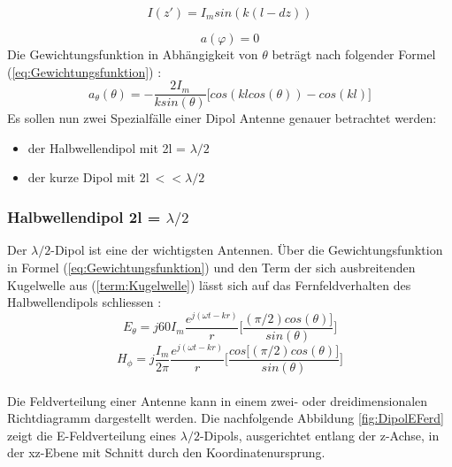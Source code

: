 \begin{equation}
I(z')=I_{m}sin(k(l-dz))
\end{equation}

\begin{equation}
a(\varphi)= 0
\end{equation}
Die Gewichtungsfunktion in Abhängigkeit von $\theta$ beträgt nach folgender Formel (\ref{eq:Gewichtungsfunktion}) \cite{elliott1981antenna}:
\begin{equation}\label{eq:Gewichtungsfunktion}
a_{\theta}(\theta)=- \frac{2I_{m}}{k sin(\theta)} \Big\lbrack cos(kl cos(\theta)) - cos(kl) \Big\rbrack
\end{equation}
Es sollen nun zwei Spezialfälle einer Dipol Antenne genauer betrachtet werden:
\begin{itemize}
\item der Halbwellendipol mit 2l = $\lambda/2$
\item der kurze Dipol mit 2l$ \ <<\lambda/2$
\end{itemize}
\newpage
\subsubsection{Halbwellendipol 2l = $\lambda/2$}
Der $\lambda/2$-Dipol ist eine der wichtigsten Antennen. Über die Gewichtungsfunktion in Formel (\ref{eq:Gewichtungsfunktion}) und den Term der sich ausbreitenden Kugelwelle aus (\ref{term:Kugelwelle}) lässt sich auf das Fernfeldverhalten des Halbwellendipols schliessen \cite{elliott1981antenna}:\\
\begin{equation}
E_{\theta}=j60I_{m} \frac{e^{j(\omega t - kr)}}{r} \biggl\lbrack \frac{  (\pi/2) cos(\theta)\rbrack}{sin(\theta)} \biggr\rbrack
\end{equation}
\begin{equation}
H_{\phi}=j \frac{I_{m}}{2\pi} \frac{e^{j(\omega t - kr)}}{r} \biggl\lbrack \frac{cos\lbrack  (\pi/2) cos(\theta)\rbrack}{sin(\theta)} \biggr\rbrack
\end{equation}\\
Die Feldverteilung einer Antenne kann in einem zwei- oder dreidimensionalen Richtdiagramm dargestellt werden. Die nachfolgende Abbildung \ref{fig:DipolEFerd} zeigt die E-Feldverteilung eines $\lambda/2$-Dipols, ausgerichtet entlang der z-Achse, in der xz-Ebene mit Schnitt durch den Koordinatenursprung.\\



